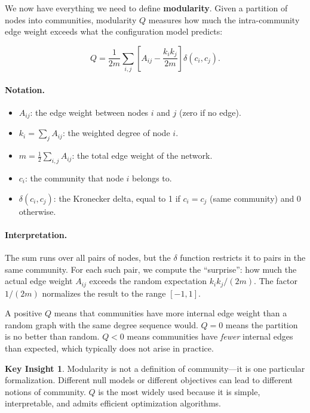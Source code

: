 \documentclass[11pt]{article}
\theoremstyle{definition}
\newtheorem{insight}{Key Insight}
\begin{document}
We now have everything we need to define \textbf{modularity}. Given a partition of nodes into communities, modularity $Q$ measures how much the intra-community edge weight exceeds what the configuration model predicts:

\[
  Q = \frac{1}{2m} \sum_{i,j} \left[ A_{ij} - \frac{k_i k_j}{2m} \right] \delta(c_i, c_j).
\]

\paragraph{Notation.}
\begin{itemize}[leftmargin=2em]
  \item $A_{ij}$: the edge weight between nodes $i$ and $j$ (zero if no edge).
  \item $k_i = \sum_j A_{ij}$: the weighted degree of node $i$.
  \item $m = \frac{1}{2} \sum_{i,j} A_{ij}$: the total edge weight of the network.
  \item $c_i$: the community that node $i$ belongs to.
  \item $\delta(c_i, c_j)$: the Kronecker delta, equal to 1 if $c_i = c_j$ (same community) and 0 otherwise.
\end{itemize}

\paragraph{Interpretation.} The sum runs over all pairs of nodes, but the $\delta$ function restricts it to pairs in the same community. For each such pair, we compute the ``surprise'': how much the actual edge weight $A_{ij}$ exceeds the random expectation $k_i k_j / (2m)$. The factor $1/(2m)$ normalizes the result to the range $[-1, 1]$.

A positive $Q$ means that communities have more internal edge weight than a random graph with the same degree sequence would. $Q = 0$ means the partition is no better than random. $Q < 0$ means communities have \emph{fewer} internal edges than expected, which typically does not arise in practice.

\begin{insight}
  Modularity is not a definition of community---it is one particular formalization. Different null models or different objectives can lead to different notions of community. $Q$ is the most widely used because it is simple, interpretable, and admits efficient optimization algorithms.
\end{insight}
\end{document}
